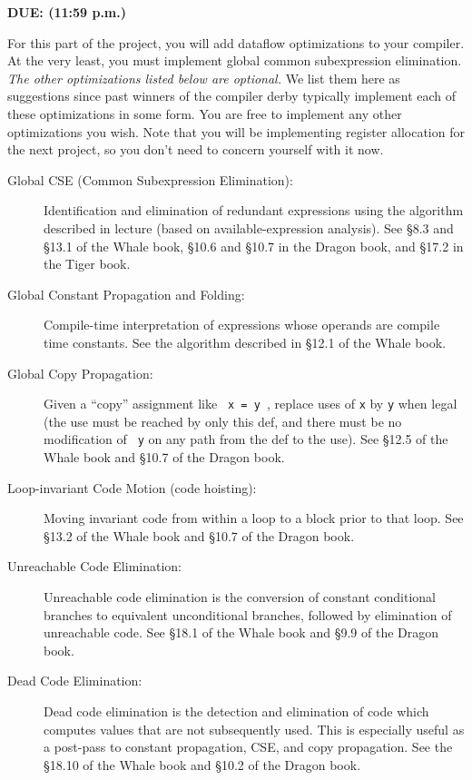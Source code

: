 


{\bf DUE: \DATAFLOWDUE (11:59 p.m.)}

For this part of the project, you will add dataflow optimizations to
your compiler.  At the very least, you must implement global common
subexpression elimination.  {\it The other optimizations listed below
are optional.}  We list them here as suggestions since past winners of
the compiler derby typically implement each of these optimizations in
some form.  You are free to implement any other optimizations you
wish.  Note that you will be implementing register allocation for the
next project, so you don't need to concern yourself with it now.

\begin{description}

\item[Global CSE (Common Subexpression Elimination):] Identification
and elimination of redundant expressions using the algorithm described
in lecture (based on available-expression analysis).  See
\S 8.3 and \S 13.1 of the Whale book, \S 10.6 and \S 10.7 in the
Dragon book, and \S 17.2 in the Tiger book.

\item[Global Constant Propagation and Folding:] Compile-time
interpretation of expressions whose operands are compile time
constants.  See the algorithm described in \S 12.1 of the Whale book.

\item[Global Copy Propagation:] Given a ``copy'' assignment like {\tt
x = y }, replace uses of {\tt x} by {\tt y} when legal (the use must
be reached by only this def, and there must be no modification of {\tt
y} on any path from the def to the use).  See \S 12.5 of the Whale
book and \S 10.7 of the Dragon book.

\item[Loop-invariant Code Motion (code hoisting):] Moving invariant code
from within a loop to a block prior to that loop.  See \S 13.2 of the
Whale book and \S 10.7 of the Dragon book.

\item[Unreachable Code Elimination:] Unreachable code elimination is
the conversion of constant conditional branches to equivalent
unconditional branches, followed by elimination of unreachable code.
See \S 18.1 of the Whale book and \S 9.9 of the Dragon book.

\item[Dead Code Elimination:] Dead code elimination is the detection
and elimination of code which computes values that are not
subsequently used.  This is especially useful as a post-pass to
constant propagation, CSE, and copy propagation.  See the \S 18.10 of
the Whale book and \S 10.2 of the Dragon book.

\end{description}

